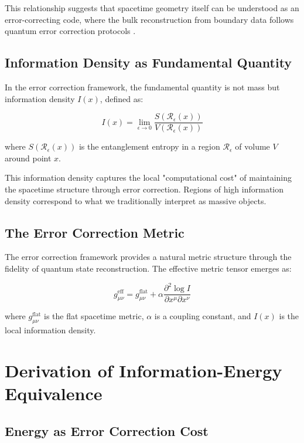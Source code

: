\documentclass[12pt]{article}
\begin{document}
This relationship suggests that spacetime geometry itself can be understood as an error-correcting code, where the bulk reconstruction from boundary data follows quantum error correction protocols \cite{Almheiri2015}.

\subsection{Information Density as Fundamental Quantity}

In the error correction framework, the fundamental quantity is not mass but information density $I(x)$, defined as:

\begin{equation}
I(x) = \lim_{\epsilon \to 0} \frac{S(\mathcal{R}_\epsilon(x))}{V(\mathcal{R}_\epsilon(x))}
\end{equation}

where $S(\mathcal{R}_\epsilon(x))$ is the entanglement entropy in a region $\mathcal{R}_\epsilon$ of volume $V$ around point $x$.

This information density captures the local "computational cost" of maintaining the spacetime structure through error correction. Regions of high information density correspond to what we traditionally interpret as massive objects.

\subsection{The Error Correction Metric}

The error correction framework provides a natural metric structure through the fidelity of quantum state reconstruction. The effective metric tensor emerges as:

\begin{equation}
g_{\mu\nu}^{\text{eff}} = g_{\mu\nu}^{\text{flat}} + \alpha \frac{\partial^2 \log I}{\partial x^\mu \partial x^\nu}
\end{equation}

where $g_{\mu\nu}^{\text{flat}}$ is the flat spacetime metric, $\alpha$ is a coupling constant, and $I(x)$ is the local information density.

\section{Derivation of Information-Energy Equivalence}

\subsection{Energy as Error Correction Cost}
\end{document}
